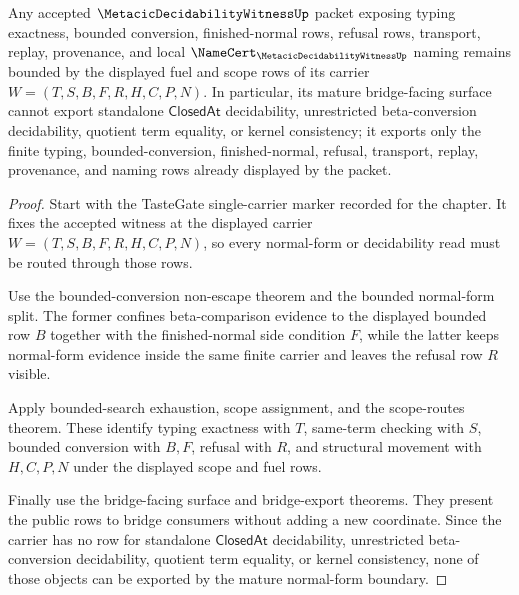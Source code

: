\begin{theorem}
\label{thm:metacic-decidability-witness-mature-normal-form-boundary}
Any accepted $\MetacicDecidabilityWitnessUp$ packet exposing typing exactness, bounded conversion, finished-normal rows, refusal rows, transport, replay, provenance, and local $\NameCert_{\MetacicDecidabilityWitnessUp}$ naming remains bounded by the displayed fuel and scope rows of its carrier $W=(T,S,B,F,R,H,C,P,N)$. In particular, its mature bridge-facing surface cannot export standalone $\mathsf{ClosedAt}$ decidability, unrestricted beta-conversion decidability, quotient term equality, or kernel consistency; it exports only the finite typing, bounded-conversion, finished-normal, refusal, transport, replay, provenance, and naming rows already displayed by the packet.
\end{theorem}
\begin{proof}
Start with the TasteGate single-carrier marker recorded for the chapter. It fixes the accepted witness at the displayed carrier $W=(T,S,B,F,R,H,C,P,N)$, so every normal-form or decidability read must be routed through those rows.

Use the bounded-conversion non-escape theorem and the bounded normal-form split. The former confines beta-comparison evidence to the displayed bounded row $B$ together with the finished-normal side condition $F$, while the latter keeps normal-form evidence inside the same finite carrier and leaves the refusal row $R$ visible.

Apply bounded-search exhaustion, scope assignment, and the scope-routes theorem. These identify typing exactness with $T$, same-term checking with $S$, bounded conversion with $B,F$, refusal with $R$, and structural movement with $H,C,P,N$ under the displayed scope and fuel rows.

Finally use the bridge-facing surface and bridge-export theorems. They present the public rows to bridge consumers without adding a new coordinate. Since the carrier has no row for standalone $\mathsf{ClosedAt}$ decidability, unrestricted beta-conversion decidability, quotient term equality, or kernel consistency, none of those objects can be exported by the mature normal-form boundary.
\end{proof}


